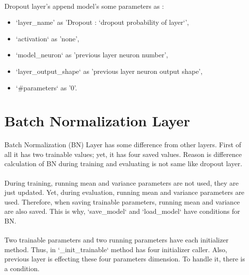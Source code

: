\documentclass[12pt]{report}
\begin{document}
\paragraph{}
Dropout layer's append model's some parameters as :

\begin{itemize}
	\item `layer\_name' as 'Dropout : `dropout probability of layer`',
	\item `activation` as 'none',
	\item `model\_neuron` as 'previous layer neuron number',
	\item `layer\_output\_shape` as 'previous layer neuron output shape',
	\item `\#parameters` as '0'.
\end{itemize}



\section{Batch Normalization Layer}

\paragraph{}
Batch Normalization (BN) Layer has some difference from other layers. First of all it has two trainable values; yet, it has four saved values. Reason is difference calculation of BN during training and evaluating is not same like dropout layer. 

\paragraph{}
During training, running mean and variance parameters are not used, they are just updated. Yet, during evaluation, running mean and variance parameters are used. Therefore, when saving trainable parameters, running mean and variance are also saved. This is why, `save\_model` and `load\_model` have conditions for BN.

\paragraph{}
Two trainable parameters and two running parameters have each initializer method. Thus, in `\_init\_trainable` method has four initializer caller. Also, previous layer is effecting these four parameters dimension. To handle it, there is a condition. 
\end{document}
